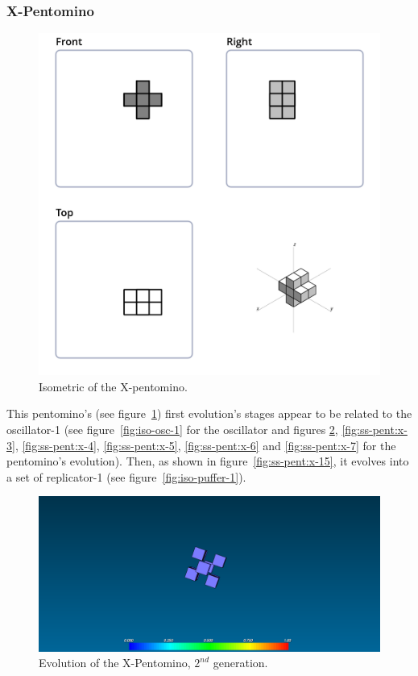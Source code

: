 \subsubsection{X-Pentomino}
\label{sec:x-pentomino}

\begin{figure}[H]
	\centering
	\includegraphics[scale=0.3]{iso_diagrams/x.png}
	\caption{Isometric of the X-pentomino.}
	\label{fig:iso-pent-x}
\end{figure}

This pentomino's (see figure~\ref{fig:iso-pent-x}) first evolution's stages
appear to be related to the oscillator-1 (see figure~\ref{fig:iso-osc-1} for the
oscillator and figures \ref{fig:ss-pent:x-2}, \ref{fig:ss-pent:x-3},
\ref{fig:ss-pent:x-4}, \ref{fig:ss-pent:x-5}, \ref{fig:ss-pent:x-6} and
\ref{fig:ss-pent:x-7} for the pentomino's evolution). Then, as shown in
figure~\ref{fig:ss-pent:x-15}, it evolves into a set of replicator-1 (see
figure~\ref{fig:iso-puffer-1}).

\begin{figure}[H]
	\centering
	\includegraphics[scale=0.3]{pentominoes_ss/x_2.png}
	\caption{Evolution of the X-Pentomino, $2^{nd}$ generation.}
	\label{fig:ss-pent:x-2}
\end{figure}

